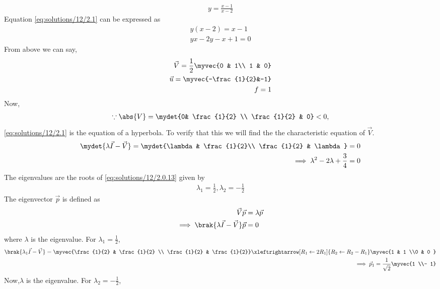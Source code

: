 
\begin{align}
y=\frac{x-1}{x-2}\label{eq:solutions/12/2.1}
\end{align}
Equation \eqref{eq:solutions/12/2.1} can be expressed as
\begin{align}
y(x-2)=x-1\\
yx-2y-x+1=0\label{eq:solutions/12/2.0.3}
\end{align}
From above we can say,
\begin{align}
\vec{V}=\frac{1}{2}\myvec{0 & 1\\ 1 & 0}\\
\vec{u}=\myvec{-\frac{1}{2}&-1}\\
f=1
\end{align}
Now,
\begin{align}
\because \abs{V} = \mydet{0& \frac{1}{2} \\ \frac{1}{2} & 0} < 0,
\end{align}
\eqref{eq:solutions/12/2.1} is the equation of a hyperbola. To verify that this we will find the the characteristic equation of $\vec{V}$.
\begin{align}
\mydet{\lambda \vec{I}-\vec{V}} = \mydet{\lambda  & \frac{1}{2}\\ \frac{1}{2} & \lambda } &= 0
\\
\implies \lambda^2 - 2\lambda + \frac{3}{4} &= 0
\label{eq:solutions/12/2.0.13}
\end{align}
The eigenvalues are the roots of \eqref{eq:solutions/12/2.0.13} given by
\begin{align}
\lambda_1 = \frac{1}{2}, \lambda_2 = -\frac{1}{2}
\label{eq:solutions/12/2.0.14}
\end{align}
The eigenvector $\vec{p}$ is defined as
\begin{align}
\vec{V} \vec{p}&= \lambda \vec{p}
\\
\implies \brak{\lambda\vec{I}-\vec{V}}\vec{p} &=0
\end{align}
where $\lambda$ is the eigenvalue.  For $\lambda_1 = \frac{1}{2}$,
\begin{align}
\brak{\lambda_1\vec{I}-\vec{V}}
= \myvec{\frac{1}{2} & \frac{1}{2}
\\ \frac{1}{2} & \frac{1}{2}} 
\xleftrightarrow[R_1 \leftarrow 2R_1] {R_2\leftarrow R_2-R_1}\myvec{1 & 1 \\0 & 0 }  
\\
\implies \vec{p}_1 = \frac{1}{\sqrt{2}}\myvec{1 \\- 1}
\end{align}
Now,$\lambda$ is the eigenvalue.  For $\lambda_2 = -\frac{1}{2}$,

